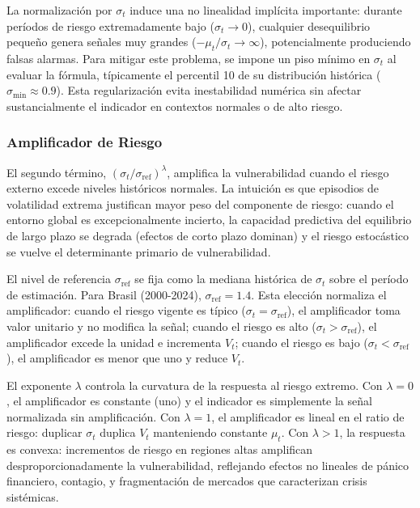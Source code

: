 \documentclass[3p,11pt,draft,natbib=false]{elsarticle}
\begin{document}
La normalización por $\sigma_t$ induce una no linealidad implícita importante: durante períodos de riesgo extremadamente bajo ($\sigma_t \to 0$), cualquier desequilibrio pequeño genera señales muy grandes ($-\mu_t/\sigma_t \to \infty$), potencialmente produciendo falsas alarmas. Para mitigar este problema, se impone un piso mínimo en $\sigma_t$ al evaluar la fórmula, típicamente el percentil 10 de su distribución histórica ($\sigma_{\min} \approx 0.9$). Esta regularización evita inestabilidad numérica sin afectar sustancialmente el indicador en contextos normales o de alto riesgo.

\subsubsection{Amplificador de Riesgo}

El segundo término, $(\sigma_t/\sigma_{\text{ref}})^\lambda$, amplifica la vulnerabilidad cuando el riesgo externo excede niveles históricos normales. La intuición es que episodios de volatilidad extrema justifican mayor peso del componente de riesgo: cuando el entorno global es excepcionalmente incierto, la capacidad predictiva del equilibrio de largo plazo se degrada (efectos de corto plazo dominan) y el riesgo estocástico se vuelve el determinante primario de vulnerabilidad.

El nivel de referencia $\sigma_{\text{ref}}$ se fija como la mediana histórica de $\sigma_t$ sobre el período de estimación. Para Brasil (2000-2024), $\sigma_{\text{ref}} = 1.4$. Esta elección normaliza el amplificador: cuando el riesgo vigente es típico ($\sigma_t = \sigma_{\text{ref}}$), el amplificador toma valor unitario y no modifica la señal; cuando el riesgo es alto ($\sigma_t > \sigma_{\text{ref}}$), el amplificador excede la unidad e incrementa $V_t$; cuando el riesgo es bajo ($\sigma_t < \sigma_{\text{ref}}$), el amplificador es menor que uno y reduce $V_t$.

El exponente $\lambda$ controla la curvatura de la respuesta al riesgo extremo. Con $\lambda = 0$, el amplificador es constante (uno) y el indicador es simplemente la señal normalizada sin amplificación. Con $\lambda = 1$, el amplificador es lineal en el ratio de riesgo: duplicar $\sigma_t$ duplica $V_t$ manteniendo constante $\mu_t$. Con $\lambda > 1$, la respuesta es convexa: incrementos de riesgo en regiones altas amplifican desproporcionadamente la vulnerabilidad, reflejando efectos no lineales de pánico financiero, contagio, y fragmentación de mercados que caracterizan crisis sistémicas.
\end{document}
